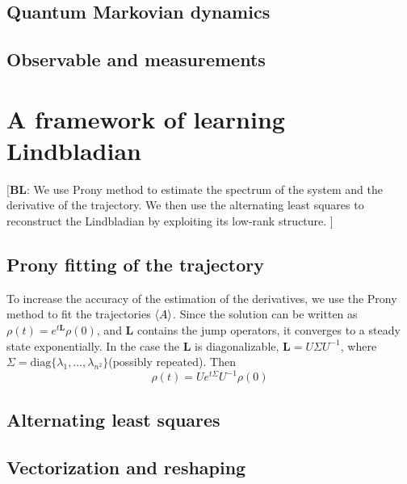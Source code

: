 \documentclass[10pt]{article}  %
\theoremstyle{plain}
\numberwithin{equation}{section}
\newcommand{\bL}{\mathbf{L}}
\newcommand{\diag}{\text{diag}}
\newcommand{\bl}[1]{{\color{magenta} [\textbf{BL}: #1]}}
\begin{document}
\subsection{Quantum Markovian dynamics}

\subsection{Observable and measurements}

\section{A framework of learning Lindbladian}
\bl{We use Prony method to estimate the spectrum of the system and the derivative of the trajectory. We then use the alternating least squares to reconstruct the Lindbladian by exploiting its low-rank structure.
}

\subsection{Prony fitting of the trajectory}
To increase the accuracy of the estimation of the derivatives, we use the Prony method to fit the trajectories $\expval{A}$. Since the solution can be written as $\rho(t) = e^{t\bL } \rho(0)$, and $\bL$ contains the jump operators, it converges to a steady state exponentially. In the case the $\bL$ is diagonalizable, $\bL = U \Sigma U^{-1}$, where $\Sigma = \diag\{\lambda_1, \dots, \lambda_{n^2}\}$(possibly repeated). Then 
\begin{equation}
	\rho(t) = Ue^{t\Sigma}U^{-1}\rho(0)
\end{equation}
\subsection{Alternating least squares}




\subsection{Vectorization and reshaping}
\end{document}
